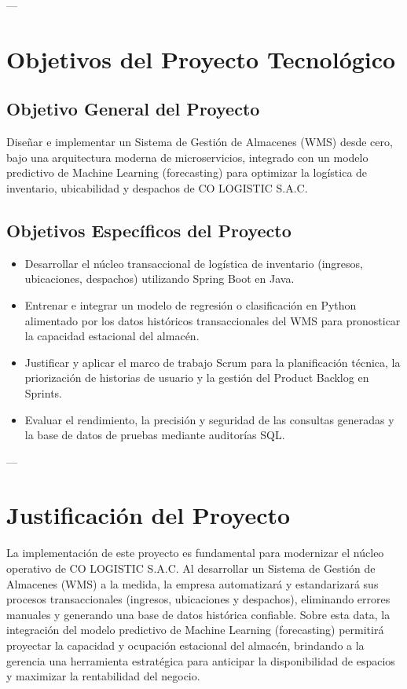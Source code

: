 \documentclass[11pt]{article}
\begin{document}
---

\section{Objetivos del Proyecto Tecnológico}

\subsection{Objetivo General del Proyecto}
Diseñar e implementar un Sistema de Gestión de Almacenes (WMS) desde cero, bajo una arquitectura moderna de microservicios, integrado con un modelo predictivo de Machine Learning (forecasting) para optimizar la logística de inventario, ubicabilidad y despachos de CO LOGISTIC S.A.C.

\subsection{Objetivos Específicos del Proyecto}
\begin{itemize}[label=\textbullet]
  \item Desarrollar el núcleo transaccional de logística de inventario (ingresos, ubicaciones, despachos) utilizando Spring Boot en Java.
  \item Entrenar e integrar un modelo de regresión o clasificación en Python alimentado por los datos históricos transaccionales del WMS para pronosticar la capacidad estacional del almacén.
  \item Justificar y aplicar el marco de trabajo Scrum para la planificación técnica, la priorización de historias de usuario y la gestión del Product Backlog en Sprints.
  \item Evaluar el rendimiento, la precisión y seguridad de las consultas generadas y la base de datos de pruebas mediante auditorías SQL.
\end{itemize}

---

\section{Justificación del Proyecto}

La implementación de este proyecto es fundamental para modernizar el núcleo operativo de CO LOGISTIC S.A.C. Al desarrollar un Sistema de Gestión de Almacenes (WMS) a la medida, la empresa automatizará y estandarizará sus procesos transaccionales (ingresos, ubicaciones y despachos), eliminando errores manuales y generando una base de datos histórica confiable. Sobre esta data, la integración del modelo predictivo de Machine Learning (forecasting) permitirá proyectar la capacidad y ocupación estacional del almacén, brindando a la gerencia una herramienta estratégica para anticipar la disponibilidad de espacios y maximizar la rentabilidad del negocio.
\end{document}
